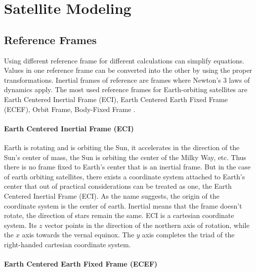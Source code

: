 \chapter{Satellite Modeling}

\section{Reference Frames}


Using different reference frame for different calculations can simplify equations. Values in one reference frame can be converted into the other by using the proper transformations.
Inertial frames of reference are frames where Newton's 3 laws of dynamics apply.
The most used reference frames for Earth-orbiting satellites are Earth Centered Inertial Frame (ECI), Earth Centered Earth Fixed Frame (ECEF), Orbit Frame, Body-Fixed Frame  \cite{ref1} \cite{ref2}.

\subsubsection{Earth Centered Inertial Frame (ECI)}
Earth is rotating and is orbiting the Sun, it accelerates in the direction of the Sun's center of mass, the Sun is orbiting the center of the Milky Way, etc. Thus there is no frame fixed to Earth's center that is an inertial frame. But in the case of earth orbiting satellites, there exists a coordinate system attached to Earth's center that out of practical considerations can be treated as one, the Earth Centered Inertial Frame (ECI).
As the name suggests, the origin of the coordinate system is the center of earth. Inertial means that the frame doesn't rotate, the direction of stars remain the same. 
ECI is a cartesian coordinate system. Its $z$ vector points in the direction of the northern axis of rotation, while the $x$ axis towards the vernal equinox. The $y$ axis completes the triad of the right-handed cartesian coordinate system.




\subsubsection{Earth Centered Earth Fixed Frame (ECEF)}


